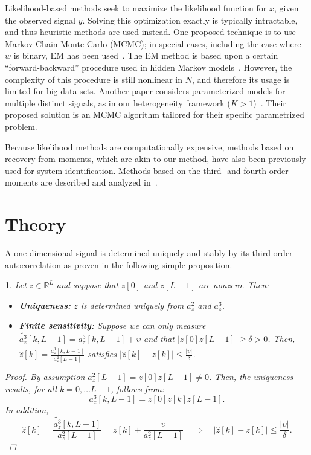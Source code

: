 \documentclass[english,11pt]{article}
\numberwithin{equation}{section}
\theoremstyle{plain}
\theoremstyle{definition}
\theoremstyle{remark}
\theoremstyle{plain}
\theoremstyle{remark}
\theoremstyle{plain}
\theoremstyle{plain}
\newtheorem{proposition}[thm]{\protect\propositionname}
\providecommand{\propositionname}{Proposition}
\newcommand{\RL}{\mathbb{R}^L}
\begin{document}
Likelihood-based methods seek to maximize the likelihood function for $x$,
given the observed signal $y$. Solving this optimization exactly is typically
intractable, and thus heuristic methods are used instead. One proposed technique is to use Markov Chain Monte Carlo (MCMC); in special
cases, including the case where $w$ is binary, EM has been used~\cite{cappe1999simulation}.
The EM method is based upon a certain ``forward-backward'' procedure
used in hidden Markov models~\cite{rabiner1989tutorial}. 
However, the complexity of this procedure is still nonlinear in $N$, and therefore its usage is limited for big data sets.   
Another paper considers parameterized models for multiple distinct signals, as in our heterogeneity framework ($K>1$)~\cite{andrieu2001bayesian}.
Their proposed solution is an MCMC algorithm tailored for their specific parametrized problem.

Because likelihood methods are computationally expensive, methods based
on recovery from moments, which are akin to our method, have
also been previously used for system identification. 
Methods based on the third- and fourth-order moments are described and analyzed in~\cite{lii1982deconvolution,giannakis1989identification,tugnait1984identification}.

\section{Theory} \label{sec:theory}

A one-dimensional signal is determined uniquely and stably by its third-order autocorrelation as proven in the following simple proposition.
\begin{proposition} \label{prop:uniqueness}
	Let $z\in\RL$ and suppose that $z[0]$ and $z[L-1]$ are nonzero. Then:
	\begin{itemize}
		\item \textbf{Uniqueness:} 	 $z$  is determined uniquely from  $a_z^2$ and $a_z^3$.
		\item \textbf{Finite sensitivity:} 	Suppose we can only measure $\tilde{a_z^3}[k,L-1] = a_z^3[k,L-1]+\upsilon$ and that $\vert z[0]z[L-1]\vert \geq \delta>0$.
		Then,  $\hat{z}[k] =\frac{\tilde{a_z^3}[k,L-1]}{a_z^2[L-1]} $ satisfies $\vert \hat{z}[k] - z[k]\vert\leq \frac{\vert \upsilon\vert }{\delta}$. 
	\end{itemize}
	\begin{proof}
		By assumption $a_z^2[L-1] = z[0]z[L-1]\neq 0$.
		Then, the uniqueness results, for all $k=0,\ldots L-1$,  follows from:
		\begin{equation*}
		a_z^3[k,L-1] = z[0]z[k]z[L-1].
		\end{equation*}
		In addition, 
		\begin{equation*}
		\hat{z}[k] = \frac{\tilde{a_z^3}[k,L-1]}{a_z^2[L-1]} = z[k]+\frac{\upsilon}{a_z^2[L-1]} \quad \Rightarrow \quad \vert \hat{z}[k] - {z}[k]\vert \leq \frac{\vert\upsilon\vert}{\delta}.
		\end{equation*} 
	\end{proof}
\end{proposition}
\end{document}
